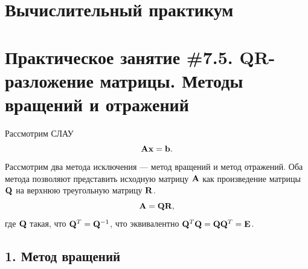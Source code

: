 \documentclass[12pt]{article}
\begin{document}
    \begin{flushright}
    \end{flushright}
    \begin{flushright}
    \end{flushright}
    \section*{Вычислительный практикум}
    \section*{Практическое занятие \#7.5. QR-разложение матрицы. Методы вращений и отражений}
	
	Рассмотрим СЛАУ
	\begin{equation}
		\bold{Ax}=\bold{b}.\label{fm0}
	\end{equation}
	Рассмотрим два метода исключения --- метод вращений и метод отражений. Оба метода позволяют представить исходную матрицу $\bold A$ как произведение матрицы $\bold Q$ на верхнюю треугольную матрицу $\bold R$.
	\begin{equation}
		\bold{A}=\bold{QR},
	\end{equation}
	где $\bold{Q}$ такая, что $\bold{Q}^{T}=\bold{Q}^{-1}$, что эквивалентно $\bold{Q}^T \bold{Q}=\bold{Q}\bold{Q}^T=\bold{E}$.
	
    \subsection*{1. Метод вращений}
\end{document}
